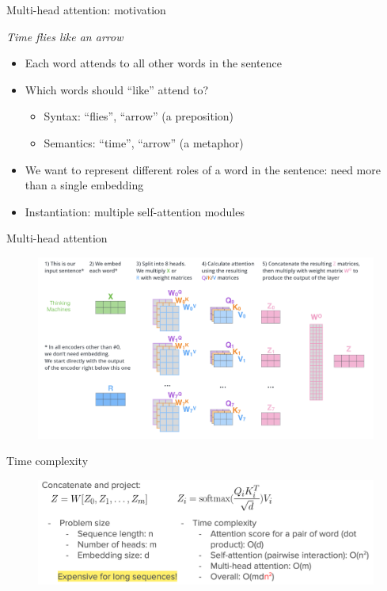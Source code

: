 \documentclass[usenames,dvipsnames,11pt,aspectratio=169]{beamer}
\begin{document}
\begin{frame}
    {Multi-head attention: motivation}
    \begin{center}
        \textit{Time flies like an arrow}
    \end{center}
    \begin{itemize}
        \item Each word attends to all other words in the sentence
        \item Which words should ``like'' attend to?
            \begin{itemize}
                \item Syntax: ``flies'', ``arrow'' (a preposition)
                \item Semantics: ``time'', ``arrow'' (a metaphor)
            \end{itemize}
        \item We want to represent different roles of a word in the sentence: need more than a single embedding
        \item Instantiation: multiple self-attention modules
    \end{itemize}
\end{frame}

\begin{frame}
    {Multi-head attention}
    \begin{figure}
        \includegraphics[width=.9\textwidth]{figures/multi-head}
    \end{figure}
\end{frame}

\begin{frame}
    {Time complexity}
    \begin{figure}
        \includegraphics[width=\textwidth]{figures/multihead-time}
    \end{figure}
\end{frame}
\end{document}
